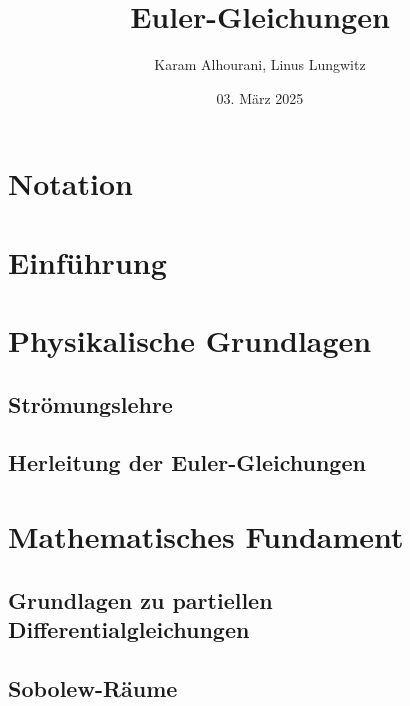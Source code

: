 \documentclass[11pt,a4paper]{article}
\author{Karam Alhourani, Linus Lungwitz}
\title{Euler-Gleichungen}
\date{03. März 2025}
\theoremstyle{definition}
\numberwithin{equation}{section} %
\begin{document}
\maketitle

\newpage

\tableofcontents

\newpage

\section*{Notation}



\newpage

\section{Einführung}



\section{Physikalische Grundlagen}

\subsection{Strömungslehre}

\subsection{Herleitung der Euler-Gleichungen}

\section{Mathematisches Fundament}

\subsection{Grundlagen zu partiellen Differentialgleichungen}





\subsection{Sobolew-Räume}
\end{document}

